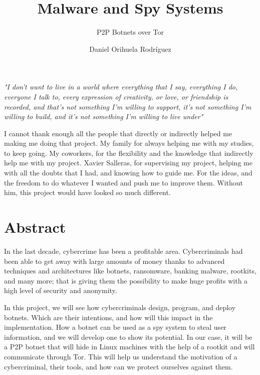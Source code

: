 \documentclass[11pt, a4paper,twoside]{tesi_upf}
\title{Malware and Spy Systems}
\subtitle{P2P Botnets over Tor}
\author{Daniel Orihuela Rodríguez}
\begin{document}
\frontmatter
\maketitle
\cleardoublepage

\setlength{\parskip}{1em}
\renewcommand{\baselinestretch}{1.50}\normalsize

\emph{"I don't want to live in a world where everything that I say, everything I do, everyone I talk to, every expression of creativity, or love, or friendship is recorded, and that's not something I'm willing to support, it's not something I'm willing to build, and it's not something I'm willing to live under"}

\clearpage



I cannot thank enough all the people that directly or indirectly helped me making me doing that project. My family for always helping me with my studies, to keep going. My coworkers, for the flexibility and the knowledge that indirectly help me with my project. Xavier Salleras, for supervising my project, helping me with all the doubts that I had, and knowing how to guide me. For the ideas, and the freedom to do whatever I wanted and push me to improve them. Without him, this project would have looked so much different.

\cleardoublepage

\section*{\Large \sffamily Abstract}

In the last decade, cybercrime has been a profitable area. Cybercriminals had been able to get away with large amounts of money thanks to advanced techniques and architectures like botnets, ransomware, banking malware, rootkits, and many more; that is giving them the possibility to make huge profits with a high level of security and anonymity.

In this project, we will see how cybercriminals design, program, and deploy botnets. Which are their intentions, and how will this impact in the implementation. How a botnet can be used as a spy system to steal user information, and we will develop one to show its potential. In our case, it will be a P2P botnet that will hide in Linux machines with the help of a rootkit and will communicate through Tor. This will help us understand the motivation of a cybercriminal, their tools, and how can we protect ourselves against them.
\end{document}
